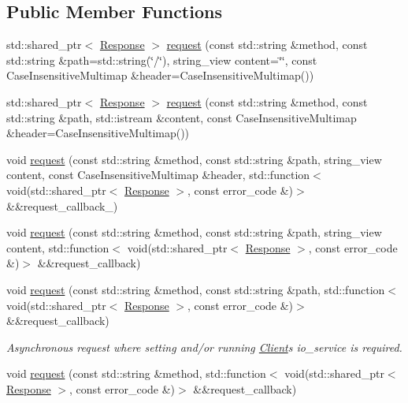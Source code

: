 \subsection*{Public Member Functions}
\begin{DoxyCompactItemize}
\item 
std\+::shared\+\_\+ptr$<$ \hyperlink{classSimpleWeb_1_1ClientBase_1_1Response}{Response} $>$ \hyperlink{classSimpleWeb_1_1ClientBase_a3f771b7ba1fda0f30dd6558b7a2f98c7}{request} (const std\+::string \&method, const std\+::string \&path=std\+::string(\char`\"{}/\char`\"{}), string\+\_\+view content=\char`\"{}\char`\"{}, const Case\+Insensitive\+Multimap \&header=Case\+Insensitive\+Multimap())
\item 
std\+::shared\+\_\+ptr$<$ \hyperlink{classSimpleWeb_1_1ClientBase_1_1Response}{Response} $>$ \hyperlink{classSimpleWeb_1_1ClientBase_ae75f536430b6b5035a3d1616002f2339}{request} (const std\+::string \&method, const std\+::string \&path, std\+::istream \&content, const Case\+Insensitive\+Multimap \&header=Case\+Insensitive\+Multimap())
\item 
void \hyperlink{classSimpleWeb_1_1ClientBase_a83c168ba1c95f3953088c4742f492210}{request} (const std\+::string \&method, const std\+::string \&path, string\+\_\+view content, const Case\+Insensitive\+Multimap \&header, std\+::function$<$ void(std\+::shared\+\_\+ptr$<$ \hyperlink{classSimpleWeb_1_1ClientBase_1_1Response}{Response} $>$, const error\+\_\+code \&)$>$ \&\&request\+\_\+callback\+\_\+)
\item 
void \hyperlink{classSimpleWeb_1_1ClientBase_aa269693c14f369c8134b0548a0427459}{request} (const std\+::string \&method, const std\+::string \&path, string\+\_\+view content, std\+::function$<$ void(std\+::shared\+\_\+ptr$<$ \hyperlink{classSimpleWeb_1_1ClientBase_1_1Response}{Response} $>$, const error\+\_\+code \&)$>$ \&\&request\+\_\+callback)
\item 
void \hyperlink{classSimpleWeb_1_1ClientBase_a6a4abeab44198640492d8d4f66ab56f4}{request} (const std\+::string \&method, const std\+::string \&path, std\+::function$<$ void(std\+::shared\+\_\+ptr$<$ \hyperlink{classSimpleWeb_1_1ClientBase_1_1Response}{Response} $>$, const error\+\_\+code \&)$>$ \&\&request\+\_\+callback)\hypertarget{classSimpleWeb_1_1ClientBase_a6a4abeab44198640492d8d4f66ab56f4}{}\label{classSimpleWeb_1_1ClientBase_a6a4abeab44198640492d8d4f66ab56f4}

\begin{DoxyCompactList}\small\item\em Asynchronous request where setting and/or running \hyperlink{classSimpleWeb_1_1Client}{Client}\textquotesingle{}s io\+\_\+service is required. \end{DoxyCompactList}\item 
void \hyperlink{classSimpleWeb_1_1ClientBase_a982722988d4ec991cdbe0c298733d332}{request} (const std\+::string \&method, std\+::function$<$ void(std\+::shared\+\_\+ptr$<$ \hyperlink{classSimpleWeb_1_1ClientBase_1_1Response}{Response} $>$, const error\+\_\+code \&)$>$ \&\&request\+\_\+callback)\hypertarget{classSimpleWeb_1_1ClientBase_a982722988d4ec991cdbe0c298733d332}{}\label{classSimpleWeb_1_1ClientBase_a982722988d4ec991cdbe0c298733d332}


\end{DoxyCompactItemize}
